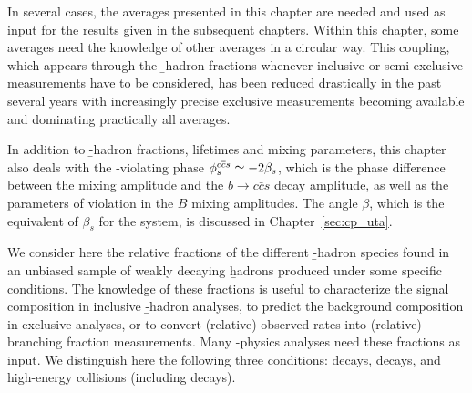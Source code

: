 In several cases, the averages presented in this chapter are 
needed and used as input for the results given in the subsequent chapters. 
Within this chapter, some averages need the knowledge of other 
averages in a circular way. This coupling, which appears through the 
\b-hadron fractions whenever inclusive or semi-exclusive measurements 
have to be considered, has been reduced drastically in the past several years 
with increasingly precise exclusive measurements becoming available
and dominating practically all averages. 

In addition to \b-hadron fractions, lifetimes and 
mixing parameters, this chapter also deals with the 
\CP-violating phase $\phiccbars\simeq -2\beta_s$, which is the phase 
difference between the \Bs mixing amplitude and the 
$b\to c\bar{c}s$ decay amplitude, as well as the parameters of \CP violation
in the $B$ mixing amplitudes. 
The angle $\beta$, which is the equivalent of $\beta_s$ for the \Bd 
system, is discussed in Chapter~\ref{sec:cp_uta}. 

 
We consider here the relative fractions of the different \b-hadron 
species found in an unbiased sample of weakly decaying \b hadrons 
produced under some specific conditions. The knowledge of these fractions
is useful to characterize the signal composition in inclusive \b-hadron 
analyses, to predict the background composition in exclusive analyses, 
or to convert (relative) observed rates into (relative) branching fraction 
measurements. 
Many \B-physics analyses need these fractions as input. We distinguish 
here the following three conditions: \Ups decays, \Upsfive decays, and 
high-energy collisions (including \Z decays). 


